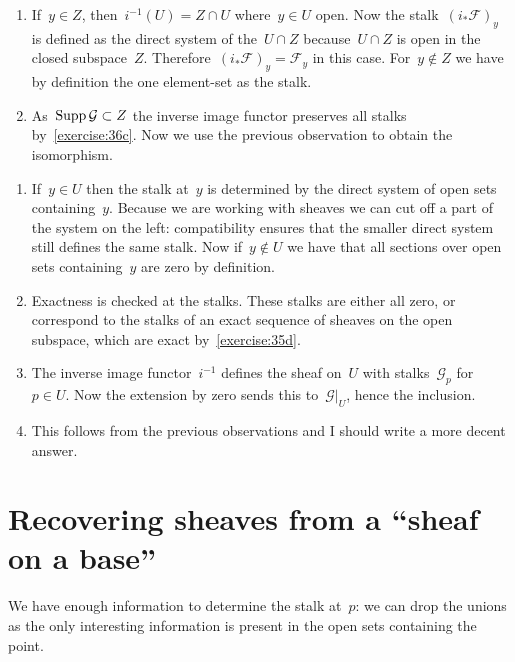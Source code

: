 \begin{exercise}
  \begin{enumerate}
    \item If~$y\in Z$, then~$i^{-1}(U)=Z\cap U$ where~$y\in U$ open. Now the stalk~$(i_*\mathcal{F})_y$ is defined as the direct system of the~$U\cap Z$ because~$U\cap Z$ is open in the closed subspace~$Z$. Therefore~$(i_*\mathcal{F})_y=\mathcal{F}_y$ in this case. For~$y\notin Z$ we have by definition the one element-set as the stalk.

    \item As~$\operatorname{Supp}\mathcal{G}\subset Z$ the inverse image functor preserves all stalks by~\autoref{exercise:36c}. Now we use the previous observation to obtain the isomorphism.
  \end{enumerate}
\end{exercise}

\begin{exercise}
  \begin{enumerate}
    \item If~$y\in U$ then the stalk at~$y$ is determined by the direct system of open sets containing~$y$. Because we are working with sheaves we can cut off a part of the system on the left: compatibility ensures that the smaller direct system still defines the same stalk. Now if~$y\notin U$ we have that all sections over open sets containing~$y$ are zero by definition.

    \item Exactness is checked at the stalks. These stalks are either all zero, or correspond to the stalks of an exact sequence of sheaves on the open subspace, which are exact by~\autoref{exercise:35d}.

    \item The inverse image functor~$i^{-1}$ defines the sheaf on~$U$ with stalks~$\mathcal{G}_p$ for~$p\in U$. Now the extension by zero sends this to~$\mathcal{G}|_U$, hence the inclusion.

    \item This follows from the previous observations and I should write a more decent answer.
  \end{enumerate}
\end{exercise}


\section{Recovering sheaves from a ``sheaf on a base''}

\begin{exercise}
  We have enough information to determine the stalk at~$p$: we can drop the unions as the only interesting information is present in the open sets containing the point.
\end{exercise}

